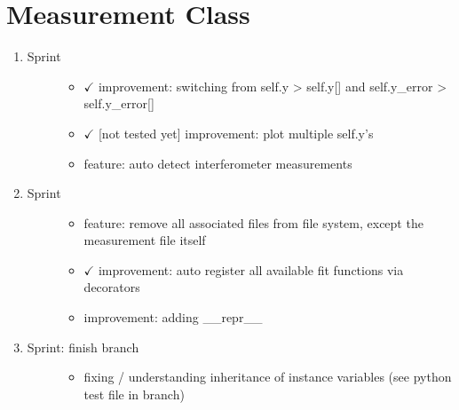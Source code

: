 \documentclass[letterpaper,10pt,english]{sphinxmanual}
\begin{document}
\section{Measurement Class}
\label{\detokenize{sprints:measurement-class}}\begin{enumerate}
\def\theenumi{\arabic{enumi}}
\def\labelenumi{\theenumi .}
\makeatletter\def\p@enumii{\p@enumi \theenumi .}\makeatother
\item {} \begin{description}
\item[{Sprint}] \leavevmode\begin{itemize}
\item {} 
\(\checkmark\) improvement: switching from self.y \textendash{}\textgreater{} self.y{[}{]} and self.y\_error \textendash{}\textgreater{} self.y\_error{[}{]}

\item {} 
\(\checkmark\) {[}not tested yet{]} improvement: plot multiple self.y’s

\item {} 
feature: auto detect interferometer measurements

\end{itemize}

\end{description}

\item {} \begin{description}
\item[{Sprint}] \leavevmode\begin{itemize}
\item {} 
feature: remove all associated files from file system, except the measurement file itself

\item {} 
\(\checkmark\) improvement: auto register all available fit functions via decorators

\item {} 
improvement: adding \_\_repr\_\_

\end{itemize}

\end{description}

\item {} \begin{description}
\item[{Sprint: finish branch }] \leavevmode\begin{itemize}
\item {} 
fixing / understanding inheritance of instance variables (see python test file in branch)


\end{itemize}
\end{description}
\end{enumerate}
\end{document}
